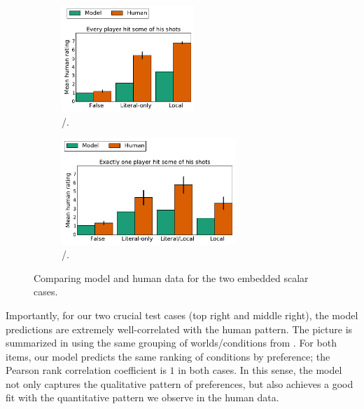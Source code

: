\documentclass[leqno]{article}
\begin{document}
\begin{figure}[t]
  \centering
  \begin{subfigure}{0.48\textwidth}
    \centering  
    \includegraphics[height=4cm]{fig/every-some-modcmp.pdf}
    \caption{/.}
    \label{fig:modcmp-everysome}
  \end{subfigure}
  \hfill
  \begin{subfigure}{0.48\textwidth}
    \centering  
    \includegraphics[height=4cm]{fig/exactlyone-some-modcmp.pdf}
    \caption{/.}
    \label{fig:modcmp-exactlyonesome}
  \end{subfigure}
  \caption{Comparing model and human data for the two embedded scalar cases.}
  \label{fig:modcmp-crucial}
\end{figure}


Importantly, for our two crucial test cases (top right and middle
right), the model predictions are extremely well-correlated with the
human pattern. The picture is summarized in
 using the same grouping of
worlds/conditions from . For both items, our model
predicts the same ranking of conditions by preference; the Pearson
rank correlation coefficient is $1$ in both cases. In this sense, the
model not only captures the qualitative pattern of preferences, but
also achieves a good fit with the quantitative pattern we observe in
the human data.

\end{document}
